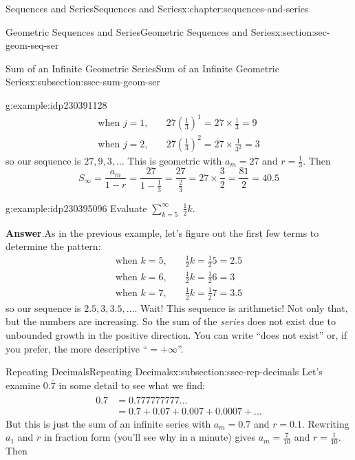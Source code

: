 \documentclass[twoside,10pt,]{book}
\newcommand{\blocktitlefont}{\relax}
\numberwithin{equation}{section}
\newcommand{\amp}{&}
\begin{document}
\begin{chapterptx}{Sequences and Series}{}{Sequences and Series}{}{}{x:chapter:sequences-and-series}
\begin{sectionptx}{Geometric Sequences and Series}{}{Geometric Sequences and Series}{}{}{x:section:sec-geom-seq-ser}
\begin{subsectionptx}{Sum of an Infinite Geometric Series}{}{Sum of an Infinite Geometric Series}{}{}{x:subsection:ssec-sum-geom-ser}
\begin{example}{}{g:example:idp230391128}
\begin{align*}
\text{when } j = 1,\quad \amp 27{\left( {\frac{1}{3}} \right)^1} = 27 \times \frac{1}{3} = 9\\
\text{when } j = 2,\quad \amp 27{\left( {\frac{1}{3}} \right)^2} = 27 \times \frac{1}{{{3^2}}} = 3
\end{align*}
so our sequence is \(27, 9, 3, \ldots\)  This is geometric with \(a_m = 27\) and \(r = \frac{1}{3}\).  Then%
\begin{equation*}
{S_\infty } = \frac{{{a_m}}}{{1 - r}}
= \frac{{27}}{{1 - \frac{1}{3}}}
= \frac{{27}}{{\frac{2}{3}}}
= 27 \times \frac{3}{2}
= \frac{{81}}{2}
= 40.5
\end{equation*}
\end{example}
 \begin{example}{}{g:example:idp230395096}%
Evaluate \(\sum\limits_{k = 5}^\infty  {\;\frac{1}{2}} k\).\par\smallskip%
\noindent\textbf{\blocktitlefont Answer}.\label{g:answer:idp230393688}{}\hypertarget{g:answer:idp230393688}{}\quad{}As in the previous example, let's figure out the first few terms to determine the pattern:%
\begin{align*}
\text{when } k = 5,\quad \amp \frac{1}{2}k = \frac{1}{2}5 = 2.5\\
\text{when } k = 6,\quad \amp \frac{1}{2}k = \frac{1}{2}6 = 3\\
\text{when } k = 7,\quad \amp \frac{1}{2}k = \frac{1}{2}7 = 3.5
\end{align*}
so our sequence is \(2.5, 3, 3.5, \ldots\).  Wait!  This sequence is arithmetic!  Not only that, but the numbers are increasing.  So the sum of the \emph{series} does not exist due to unbounded growth in the positive direction. You can write ``does not exist'' or, if you prefer, the more descriptive ``\(=+\infty\)''.\end{example}
%
\end{subsectionptx}
%
%
\typeout{************************************************}
\typeout{************************************************}
%
\begin{subsectionptx}{Repeating Decimals}{}{Repeating Decimals}{}{}{x:subsection:ssec-rep-decimals}
Let's examine \(0.\overline 7\) in some detail to see what we find:%
\begin{align*}
0.\overline 7 \amp = 0.777777777...\\
\amp = 0.7 + 0.07 + 0.007 + 0.0007 + \ldots
\end{align*}
But this is just the sum of an infinite series with \(a_m = 0.7\) and \(r = 0.1\).  Rewriting \(a_1\) and \(r\) in fraction form (you'll see why in a minute) gives \(a_m = \frac{7}{10}\) and \(r =\frac{1}{10}\).  Then%

\end{subsectionptx}
\end{sectionptx}
\end{chapterptx}
\end{document}
